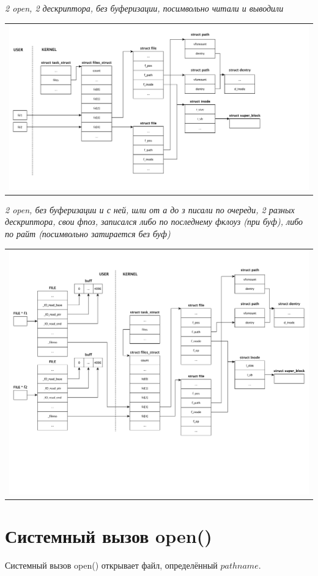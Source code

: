 \textit{2 open, 2 дескриптора, без буферизации, посимвольно читали и выводили}
\begin{table}[H]
  \centering
  \begin{tabular}{p{1\linewidth}}
    \centering
    \includegraphics[width=0.8\linewidth]{./images/scheme2.pdf}
  \end{tabular}
\end{table}

\textit{2 open, без буферизации и с ней, шли от а до з писали по очереди, 2 разных дескриптора, свои фпоз, записался либо по последнему фклоуз (при буф), либо по райт (посимвольно затирается без буф)}
\begin{table}[H]
  \centering
  \begin{tabular}{p{1\linewidth}}
    \centering
    \includegraphics[width=0.8\linewidth]{./images/scheme3.pdf}
  \end{tabular}
\end{table}

\section{Системный вызов open()}
Системный вызов open() открывает файл, определённый $pathname$.

